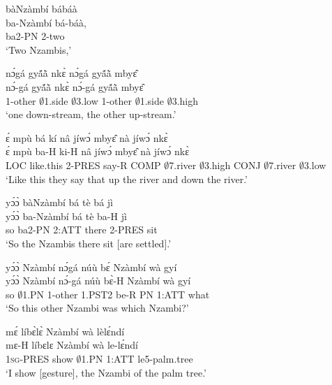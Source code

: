 \begin{exe} 
\exN\label{10}
  \glll  bàNzàmbí bábáà \\
        ba-Nzàmbí bá-báà, \\
           ba2-PN 2-two  \\
    \trans `Two Nzambis,'
\end{exe}

\begin{exe} 
\exN\label{11}
  \glll  nɔ́gá gyã́ã̀ nkɛ̀ nɔ́gá gyã́ã̀ mbyɛ̂ \\
         nɔ́-gá gyã́ã̀ nkɛ̀ nɔ́-gá gyã́ã̀ mbyɛ̂ \\
           1-other $\emptyset$1.side $\emptyset$3.low 1-other $\emptyset$1.side $\emptyset$3.high  \\
    \trans `one down-stream, the other up-stream.'
\end{exe}

\begin{exe} 
\exN\label{12}
  \glll  ɛ́ mpù bá kí nâ jíwɔ́ mbyɛ̂ nà jíwɔ́ nkɛ̀\\
         ɛ́ mpù ba-H ki-H nâ jíwɔ́ mbyɛ̂ nà jíwɔ́ nkɛ̀\\
           LOC like.this 2-PRES say-R COMP $\emptyset$7.river  $\emptyset$3.high CONJ $\emptyset$7.river $\emptyset$3.low\\
    \trans `Like this they say that up the river and down the river.'
\end{exe}

\begin{exe} 
\exN\label{13} 
  \glll  yɔ́ɔ̀ bàNzàmbí bá tè bá jì  \\
         yɔ́ɔ̀ ba-Nzàmbí bá tè ba-H jì \\
           so ba2-PN 2:ATT there 2-PRES sit   \\
    \trans `So the Nzambis there sit [are settled].'
\end{exe}

\begin{exe} 
\exN\label{14}
  \glll  yɔ́ɔ̀ Nzàmbí nɔ́gá núù bɛ́ Nzàmbí wà gyí \\
        yɔ́ɔ̀ Nzàmbí nɔ́-gá núù bɛ̀-H Nzàmbí wà gyí \\
          so $\emptyset$1.PN 1-other 1.PST2 be-R  PN 1:ATT what   \\
    \trans `So this other Nzambi was which Nzambi?'
\end{exe}

\begin{exe} 
\exN\label{15}
  \glll  mɛ́ líbɛ̀lɛ̀ Nzàmbí  wà lèlɛ́ndí \\
         mɛ-H líbɛlɛ Nzàmbí  wà le-lɛ́ndí \\
           1\textsc{sg}-PRES show $\emptyset$1.PN 1:ATT le5-palm.tree  \\
    \trans `I show [gesture], the Nzambi of the palm tree.'
\end{exe}

